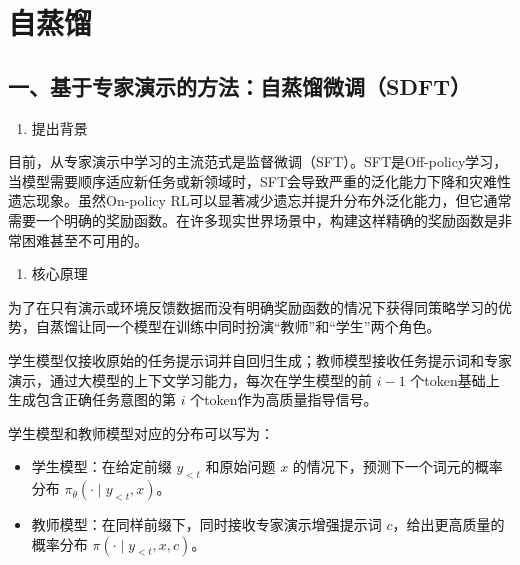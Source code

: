 \hypertarget{ux81eaux84b8ux998f}{%
\section{自蒸馏}\label{ux81eaux84b8ux998f}}

\hypertarget{ux4e00ux57faux4e8eux4e13ux5bb6ux6f14ux793aux7684ux65b9ux6cd5ux81eaux84b8ux998fux5faeux8c03sdft}{%
\subsection{一、基于专家演示的方法：自蒸馏微调（SDFT）}\label{ux4e00ux57faux4e8eux4e13ux5bb6ux6f14ux793aux7684ux65b9ux6cd5ux81eaux84b8ux998fux5faeux8c03sdft}}

\begin{enumerate}
\def\labelenumi{\arabic{enumi}.}
\tightlist
\item
  提出背景
\end{enumerate}

目前，从专家演示中学习的主流范式是监督微调（SFT）。SFT是Off-policy学习，当模型需要顺序适应新任务或新领域时，SFT会导致严重的泛化能力下降和灾难性遗忘现象。虽然On-policy RL可以显著减少遗忘并提升分布外泛化能力，但它通常需要一个明确的奖励函数。在许多现实世界场景中，构建这样精确的奖励函数是非常困难甚至不可用的。

\begin{enumerate}
\def\labelenumi{\arabic{enumi}.}
\setcounter{enumi}{1}
\tightlist
\item
  核心原理
\end{enumerate}

为了在只有演示或环境反馈数据而没有明确奖励函数的情况下获得同策略学习的优势，自蒸馏让同一个模型在训练中同时扮演``教师''和``学生''两个角色。

学生模型仅接收原始的任务提示词并自回归生成；教师模型接收任务提示词和专家演示，通过大模型的上下文学习能力，每次在学生模型的前 \(i-1\) 个token基础上生成包含正确任务意图的第 \(i\) 个token作为高质量指导信号。

学生模型和教师模型对应的分布可以写为：

\begin{itemize}
\tightlist
\item
  学生模型：在给定前缀 \(y_{<t}\) 和原始问题 \(x\) 的情况下，预测下一个词元的概率分布 \(\pi_\theta(\cdot \mid y_{<t}, x)\)。
\item
  教师模型：在同样前缀下，同时接收专家演示增强提示词 \(c\)，给出更高质量的概率分布 \(\pi(\cdot \mid y_{<t}, x, c)\)。
\end{itemize}


